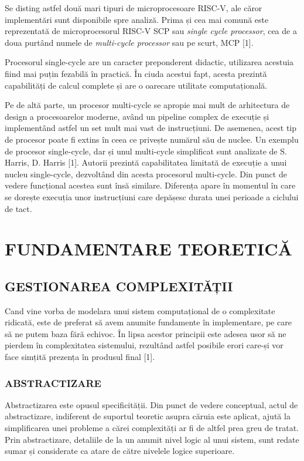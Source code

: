 \documentclass[12pt]{article}
\begin{document}
Se disting astfel două mari tipuri de microprocesoare RISC-V, ale căror implementări sunt disponibile spre analiză. Prima și cea mai comună este reprezentată de microprocesorul RISC-V SCP sau \textit{single cycle processor}, cea de a doua purtând numele de \textit{multi-cycle processor} sau pe scurt, MCP [1].

Procesorul single-cycle are un caracter preponderent didactic, utilizarea acestuia fiind mai puțin fezabilă în practică. În ciuda acestui fapt, acesta prezintă capabilități de calcul complete și are o oarecare utilitate computațională.

Pe de altă parte, un procesor multi-cycle se apropie mai mult de arhitectura de design a procesoarelor moderne, având un pipeline complex  de execuție și implementând astfel un set mult mai vast de instrucțiuni. De asemenea, acest tip de procesor poate fi extins în ceea ce privește numărul său de nuclee.
Un exemplu de procesor single-cycle, dar și unul multi-cycle simplificat sunt analizate de S. Harris, D. Harris [1]. Autorii prezintă capabilitatea limitată de execuție a unui nucleu single-cycle, dezvoltând din acesta procesorul multi-cycle. Din punct de vedere funcțional acestea sunt însă similare. Diferența apare în momentul în care se dorește execuția unor instrucțiuni care depășesc durata unei perioade a ciclului de tact.

\newpage
\section{\centering FUNDAMENTARE TEORETICĂ}
\bigbreak
\subsection{GESTIONAREA COMPLEXITĂȚII}
Cand vine vorba de modelara unui sistem computațional de o complexitate ridicată, este de preferat să avem anumite fundamente în implementare, pe care să ne putem baza fără echivoc. În lipsa acestor principii este adesea usor să ne pierdem în complexitatea sistemului, rezultând astfel posibile erori care-și vor face simțită prezența în produsul final [1].

\subsubsection{ABSTRACTIZARE}
Abstractizarea este opusul specificității. Din punct de vedere conceptual, actul de abstractizare, indiferent de suportul teoretic asupra căruia este aplicat, ajută la simplificarea unei probleme a cărei complexități ar fi de altfel prea greu de tratat. Prin abstractizare, detaliile de la un anumit nivel logic al unui sistem, sunt redate sumar și considerate ca atare de către nivelele logice superioare.
\end{document}
